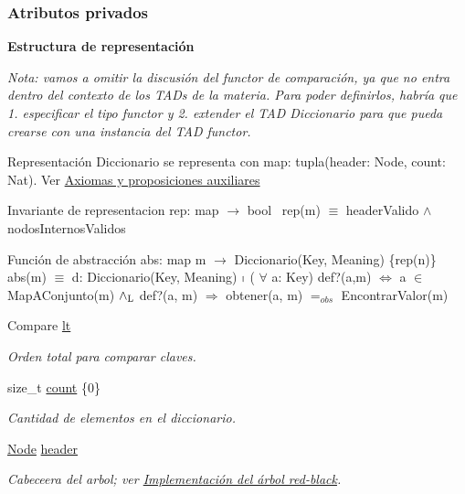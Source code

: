 \subsubsection*{Atributos privados}
\begin{Indent}\textbf{ Estructura de representación}\par
{\em Nota\+: vamos a omitir la discusión del functor de comparación, ya que no entra dentro del contexto de los T\+A\+Ds de la materia. Para poder definirlos, habría que 1. especificar el tipo functor y 2. extender el T\+AD Diccionario para que pueda crearse con una instancia del T\+AD functor.

\begin{DoxyParagraph}{Representación}
Diccionario se representa con map\+: tupla(header\+: Node, count\+: Nat). Ver \hyperlink{axiomas}{Axiomas y proposiciones auxiliares}
\end{DoxyParagraph}
\begin{DoxyParagraph}{Invariante de representacion}
rep\+: map $\to$ bool~\newline
rep(m) $\equiv$ header\+Valido $\land$ nodos\+Internos\+Validos 
\end{DoxyParagraph}


\begin{DoxyParagraph}{Función de abstracción}
abs\+: map m $\to$ Diccionario(Key, Meaning) \{rep(n)\}~\newline
abs(m) $\equiv$ d\+: Diccionario(Key, Meaning) $\shortmid$ ( $\forall$ a\+: Key) def?(a,m) $\Leftrightarrow$ a $\in$ Map\+A\+Conjunto(m) $\land_{\rm L}$ def?(a, m) $\Rightarrow$ obtener(a, m) $=_{obs}$ Encontrar\+Valor(m) 
\end{DoxyParagraph}
}\begin{DoxyCompactItemize}
\item 
Compare \hyperlink{classaed2_1_1map_a0e5be36fae0693e4665bd2a615e7550a_a0e5be36fae0693e4665bd2a615e7550a}{lt}
\begin{DoxyCompactList}\small\item\em Orden total para comparar claves. \end{DoxyCompactList}\item 
size\+\_\+t \hyperlink{classaed2_1_1map_a44236c4f16cdc20a10759862b198bde4_a44236c4f16cdc20a10759862b198bde4}{count} \{0\}
\begin{DoxyCompactList}\small\item\em Cantidad de elementos en el diccionario. \end{DoxyCompactList}\item 
\hyperlink{structaed2_1_1map_1_1Node}{Node} \hyperlink{classaed2_1_1map_a92d93f905c8ad73fba18fdc7e8915cce_a92d93f905c8ad73fba18fdc7e8915cce}{header}
\begin{DoxyCompactList}\small\item\em Cabeceera del arbol; ver \hyperlink{Implementacion}{Implementación del árbol red-\/black}. \end{DoxyCompactList}\end{DoxyCompactItemize}
\end{Indent}
